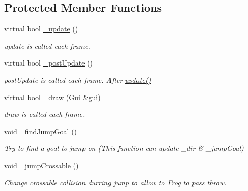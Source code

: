 \subsection*{Protected Member Functions}
\begin{DoxyCompactItemize}
\item 
virtual bool \hyperlink{class_enemy_frog_a92b77b8686f21b8ef3ee3d1cb078a2d4}{\+\_\+update} ()
\begin{DoxyCompactList}\small\item\em update is called each frame. \end{DoxyCompactList}\item 
virtual bool \hyperlink{class_enemy_frog_ab151c31f6cc89cc77830f77b02cf9372}{\+\_\+post\+Update} ()
\begin{DoxyCompactList}\small\item\em post\+Update is called each frame. After \hyperlink{class_a_enemy_a01e3b0313d6f29bf2cafe20f711c0550}{update()} \end{DoxyCompactList}\item 
virtual bool \hyperlink{class_enemy_frog_a2cf685062369505da75844967e16d344}{\+\_\+draw} (\hyperlink{class_gui}{Gui} \&gui)
\begin{DoxyCompactList}\small\item\em draw is called each frame. \end{DoxyCompactList}\item 
\mbox{\label{class_enemy_frog_ada6281afe665c1b8a627e6f2792a87e0}} 
void \hyperlink{class_enemy_frog_ada6281afe665c1b8a627e6f2792a87e0}{\+\_\+find\+Jump\+Goal} ()
\begin{DoxyCompactList}\small\item\em Try to find a goal to jump on (This function can update \+\_\+dir \& \+\_\+jump\+Goal) \end{DoxyCompactList}\item 
\mbox{\label{class_enemy_frog_a2e2cef706ab9893d243209b5c5fd28b0}} 
void \hyperlink{class_enemy_frog_a2e2cef706ab9893d243209b5c5fd28b0}{\+\_\+jump\+Crossable} ()
\begin{DoxyCompactList}\small\item\em Change crossable collision durring jump to allow to Frog to pass throw. \end{DoxyCompactList}\item 
\mbox{\label{class_enemy_frog_a83404fbd9ccc5eac576668edfef7c7a4}} 

\end{DoxyCompactItemize}
